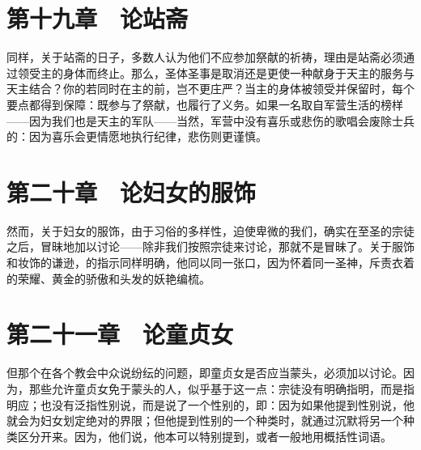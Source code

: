 
\section{第十九章　论站斋}

同样，关于站斋的日子，多数人认为他们不应参加祭献的祈祷，理由是站斋必须通过领受主的身体而终止。那么，圣体圣事是取消还是更使一种献身于天主的服务与天主结合？你的若同时在主的前，岂不更庄严？当主的身体被领受并保留时，每个要点都得到保障：既参与了祭献，也履行了义务。如果一名取自军营生活的榜样——因为我们也是天主的军队——当然，军营中没有喜乐或悲伤的歌唱会废除士兵的：因为喜乐会更情愿地执行纪律，悲伤则更谨慎。\par


\section{第二十章　论妇女的服饰}

然而，关于妇女的服饰，由于习俗的多样性，迫使卑微的我们，确实在至圣的宗徒之后，冒昧地加以讨论——除非我们按照宗徒来讨论，那就不是冒昧了。关于服饰和妆饰的谦逊，的指示同样明确，他同以同一张口，因为怀着同一圣神，斥责衣着的荣耀、黄金的骄傲和头发的妖艳编梳。\par


\section{第二十一章　论童贞女}

但那个在各个教会中众说纷纭的问题，即童贞女是否应当蒙头，必须加以讨论。因为，那些允许童贞女免于蒙头的人，似乎基于这一点：宗徒没有明确指明，而是指明应；也没有泛指性别说，而是说了一个性别的，即：因为如果他提到性别说，他就会为妇女划定绝对的界限；但他提到性别的一个种类时，就通过沉默将另一个种类区分开来。因为，他们说，他本可以特别提到，或者一般地用概括性词语。\par


